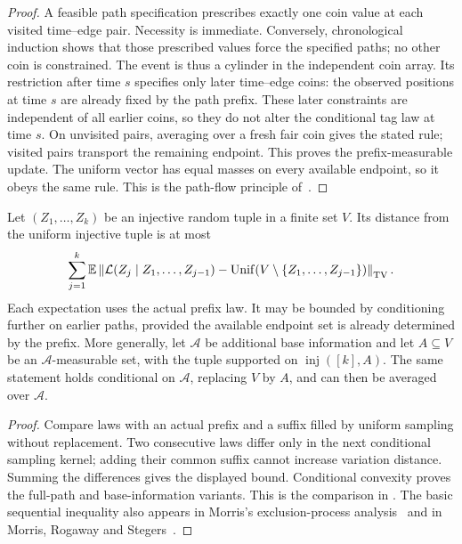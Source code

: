 \begin{proof}
A feasible path specification prescribes exactly one coin value at
each visited time--edge pair. Necessity is immediate. Conversely,
chronological induction shows that those prescribed values force the
specified paths; no other coin is constrained. The event is thus a
cylinder in the independent coin array. Its restriction after time $s$
specifies only later time--edge coins: the observed positions at time
$s$ are already fixed by the path prefix. These later constraints are
independent of all earlier coins, so they do not alter the conditional
tag law at time $s$. On unvisited pairs, averaging
over a fresh fair coin gives the stated rule; visited pairs transport
the remaining endpoint. This proves the prefix-measurable update. The uniform vector has
equal masses on every available endpoint, so it obeys the same rule.
This is the path-flow principle of~\cite[Lemma~\ref*{h-lem:path-cylinder}]{optimalThorp}.
\end{proof}

\begin{lemma}\label{lem:sequential-tv}\label{lem:sequential}
Let $(Z_1,\ldots,Z_k)$ be an injective random tuple in a finite set
$V$. Its distance from the uniform injective tuple is at most
\[
 \sum_{j=1}^k\mathbb E\left\|
 \mathcal L(Z_j\mid Z_1,\ldots,Z_{j-1})
 -\operatorname{Unif}(V\setminus\{Z_1,\ldots,Z_{j-1}\})
 \right\|_{\mathrm{TV}}.
\]
Each expectation uses the actual prefix law. It may be bounded by
conditioning further on earlier paths, provided the available endpoint
set is already determined by the prefix. More generally, let $\mathcal A$ be additional base information and let
$A\subseteq V$ be an $\mathcal A$-measurable set, with the tuple
supported on $\operatorname{inj}([k],A)$. The same statement holds
conditional on $\mathcal A$, replacing $V$ by $A$, and can then be
averaged over $\mathcal A$.
\end{lemma}

\begin{proof}
Compare laws with an actual prefix and a suffix filled by uniform
sampling without replacement. Two consecutive laws differ only in
the next conditional sampling kernel; adding their common suffix
cannot increase variation distance. Summing the differences gives
the displayed bound. Conditional convexity proves the full-path
and base-information variants. This is the comparison in
\cite[Lemma~\ref*{h-lem:sequential-tv}]{optimalThorp}.
The basic sequential inequality also appears in Morris's exclusion-process
analysis~\cite[Section~5.3, Lemma~12]{morris-exclusion2006} and in
Morris, Rogaway and Stegers~\cite[Lemma~2 and Appendix~A]{mrs}.
\end{proof}

